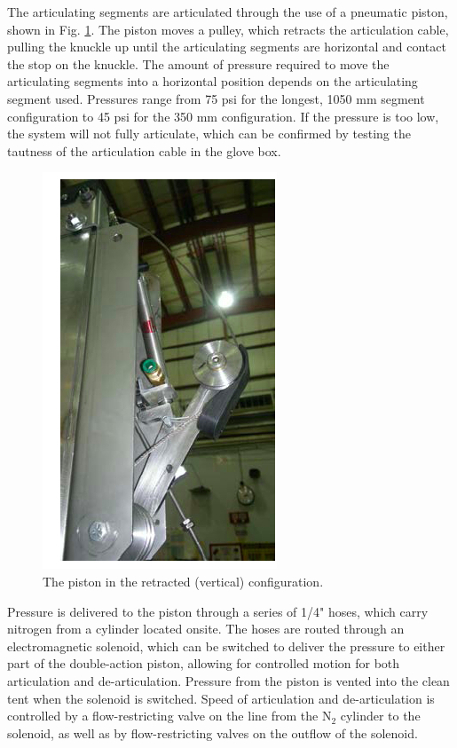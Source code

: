 	The articulating segments are articulated through the use of a pneumatic piston, shown in Fig. \ref{Pully}. The piston moves a pulley, which retracts the articulation cable, pulling the knuckle up until the articulating segments are horizontal and contact the stop on the knuckle. The amount of pressure required to move the articulating segments into a horizontal position depends on the articulating segment used. Pressures range from 75 psi for the longest, 1050 mm segment configuration to 45 psi for the 350 mm configuration. If the pressure is too low, the system will not fully articulate, which can be confirmed by testing the tautness of the articulation cable in the glove box.  
	
	\begin{figure}
	\includegraphics[width =.5 \textwidth]{AA/Pully.jpg}
	\caption{The piston in the retracted (vertical) configuration.}
	\label{Pully}
	\end{figure}
	
	Pressure is delivered to the piston through a series of 1/4" hoses, which carry nitrogen from a cylinder located onsite. The hoses are routed through an electromagnetic solenoid, which can be switched to deliver the pressure to either part of the double-action piston, allowing for controlled motion for both articulation and de-articulation. Pressure from the piston is vented into the clean tent when the solenoid is switched. Speed of articulation and de-articulation is controlled by a flow-restricting valve on the line from the N$_2$ cylinder to the solenoid, as well as by flow-restricting valves on the outflow of the solenoid. 
		
